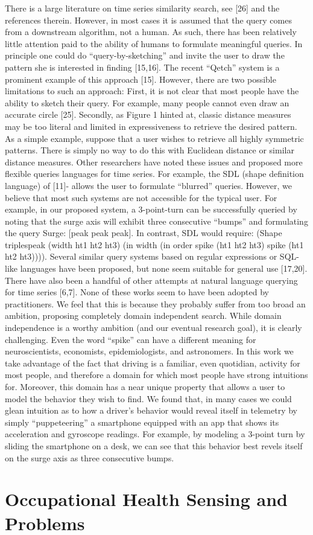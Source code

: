 There is a large literature on time series similarity search, see [26] and the references therein. However, in most cases it is assumed that the query comes from a downstream algorithm, not a human. As such, there has been relatively little attention paid to the ability of humans to formulate meaningful queries. In principle one could do “query-by-sketching” and invite the user to draw the pattern she is interested in finding [15,16]. The recent “Qetch” system is a prominent example of this approach [15]. However, there are two possible limitations to such an approach: First, it is not clear that most people have the ability to sketch their query. For example, many people cannot even draw an accurate circle [25]. Secondly, as Figure 1 hinted at, classic distance measures may be too literal and limited in expressiveness to retrieve the desired pattern. As a simple example, suppose that a user wishes to retrieve all highly symmetric patterns. There is simply no way to do this with Euclidean distance or similar distance measures.
Other researchers have noted these issues and proposed more flexible queries languages for time series. For example, the SDL (shape definition language) of [11]- allows the user to formulate “blurred” queries. However, we believe that most such systems are not accessible for the typical user. For example, in our proposed system, a 3-point-turn can be successfully queried by noting that the surge axis will exhibit three consecutive “bumps” and formulating the query Surge: [peak peak peak]. In contrast, SDL would require: 
(Shape triplespeak (width ht1 ht2 ht3) (in width (in order spike (ht1 ht2 ht3) spike (ht1 ht2 ht3)))). 
Several similar query systems based on regular expressions or SQL-like languages have been proposed, but none seem suitable for general use [17,20].	
There have also been a handful of other attempts at natural language querying for time series [6,7]. None of these works seem to have been adopted by practitioners. We feel that this is because they probably suffer from too broad an ambition, proposing completely domain independent search.  While domain independence is a worthy ambition (and our eventual research goal), it is clearly challenging. Even the word “spike” can have a different meaning for neuroscientists, economists, epidemiologists, and astronomers. In this work we take advantage of the fact that driving is a familiar, even quotidian, activity for most people, and therefore a domain for which most people have strong intuitions for. Moreover, this domain has a near unique property that allows a user to model the behavior they wish to find. We found that, in many cases we could glean intuition as to how a driver’s behavior would reveal itself in telemetry by simply “puppeteering” a smartphone equipped with an app that shows its acceleration and gyroscope readings. For example, by modeling a 3-point turn by sliding the smartphone on a desk, we can see that this behavior best revels itself on the surge axis as three consecutive bumps.


\section{Occupational Health Sensing and Problems} %
\label{sec:occupai}

